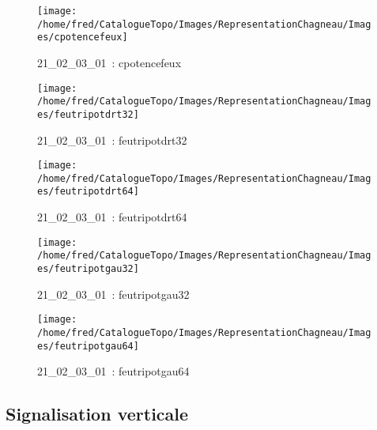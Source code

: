 \documentclass[12pt,titlepage]{book}
\begin{document}
\begin{figure}[h!]
  \begin{minipage}[t]{3cm}
    \begin{center}
      \texttt{[image: /home/fred/CatalogueTopo/Images/RepresentationChagneau/Images/cpotencefeux]}
      \caption[~21\_02\_03\_01]{\small{21\_02\_03\_01~:} \tiny{cpotencefeux}}\label{cpotencefeux}
    \end{center}
  \end{minipage}
  \begin{minipage}[t]{3cm}
    \begin{center}
      \texttt{[image: /home/fred/CatalogueTopo/Images/RepresentationChagneau/Images/feutripotdrt32]}
      \caption[~21\_02\_03\_01]{\small{21\_02\_03\_01~:} \tiny{feutripotdrt32}}\label{feutripotdrt32}
    \end{center}
  \end{minipage}
  \begin{minipage}[t]{3cm}
    \begin{center}
      \texttt{[image: /home/fred/CatalogueTopo/Images/RepresentationChagneau/Images/feutripotdrt64]}
      \caption[~21\_02\_03\_01]{\small{21\_02\_03\_01~:} \tiny{feutripotdrt64}}\label{feutripotdrt64}
    \end{center}
  \end{minipage}
  \begin{minipage}[t]{3cm}
    \begin{center}
      \texttt{[image: /home/fred/CatalogueTopo/Images/RepresentationChagneau/Images/feutripotgau32]}
      \caption[~21\_02\_03\_01]{\small{21\_02\_03\_01~:} \tiny{feutripotgau32}}\label{feutripotgau32}
    \end{center}
  \end{minipage}
  \begin{minipage}[t]{3cm}
    \begin{center}
      \texttt{[image: /home/fred/CatalogueTopo/Images/RepresentationChagneau/Images/feutripotgau64]}
      \caption[~21\_02\_03\_01]{\small{21\_02\_03\_01~:} \tiny{feutripotgau64}}\label{feutripotgau64}
    \end{center}
  \end{minipage}
\end{figure}
\subsection{Signalisation verticale}
\end{document}
